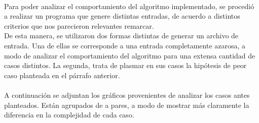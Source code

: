 \paragraph{}
Para poder analizar el comportamiento del algoritmo implementado, se procedió a realizar un programa que genere distintas entradas, de acuerdo a distintos criterios que nos parecieron relevantes remarcar.\\
De esta manera, se utilizaron dos formas distintas de generar un archivo de entrada. Una de ellas se corresponde a una entrada completamente azarosa, a modo de analizar el comportamiento del algoritmo para una extensa cantidad de casos distintos. La segunda, trata de plasmar en sus casos la hipótesis de peor caso planteada en el párrafo anterior.

\paragraph{}
A continuación se adjuntan los gráficos provenientes de analizar los casos antes planteados. Están agrupados de a pares, a modo de mostrar más claramente la diferencia en la complejidad de cada caso.
